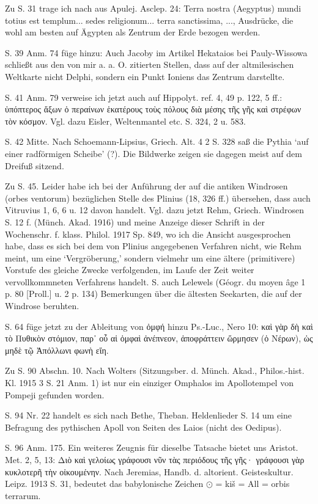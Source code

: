 \documentclass[a4paper, 11pt, oneside]{article}
\begin{document}
Zu S. 31 trage ich nach aus Apulej. Asclep. 24: Terra nostra (Aegyptus) mundi totius est templum... sedes religionum... terra sanctissima, ..., Ausdrücke, die wohl am besten auf Ägypten als Zentrum der Erde bezogen werden.

S. 39 Anm. 74 füge hinzu: Auch Jacoby im Artikel Hekataios bei Pauly-Wissowa schließt aus den von mir a. a. O. zitierten Stellen, dass auf der altmilesischen Weltkarte nicht Delphi, sondern ein Punkt Ioniens das Zentrum darstellte.

S. 41 Anm. 79 verweise ich jetzt auch auf Hippolyt. ref. 4, 49 p. 122, 5 ff.: ὑπόπτερος ἄξων ὁ περαίνων ἑκατέρους τοὺς πόλους διὰ μέσης τῆς γῆς καὶ στρέφων τὸν κόσμον. Vgl. dazu Eisler, Weltenmantel etc. S. 324, 2 u. 583.

S. 42 Mitte. Nach Schoemann-Lipsius, Griech. Alt. 4 2 S. 328 saß die Pythia `auf einer radförmigen Scheibe' (?). Die Bildwerke zeigen sie dagegen meist auf dem Dreifuß sitzend.

Zu S. 45. Leider habe ich bei der Anführung der auf die antiken Windrosen (orbes ventorum) bezüglichen Stelle des Plinius (18, 326 ff.) übersehen, dass auch Vitruvius 1, 6, 6 u. 12 davon handelt. Vgl. dazu jetzt Rehm, Griech. Windrosen S. 12 f. (Münch. Akad. 1916) und meine Anzeige dieser Schrift in der Wochenschr. f. klass. Philol. 1917 Sp. 849, wo ich die Ansicht ausgesprochen habe, dass es sich bei dem von Plinius angegebenen Verfahren nicht, wie Rehm meint, um eine `Vergröberung,' sondern vielmehr um eine ältere (primitivere) Vorstufe des gleiche Zwecke verfolgenden, im Laufe der Zeit weiter vervollkommneten Verfahrens handelt. S. auch Lelewels (Géogr. du moyen âge 1 p. 80 [Proll.] u. 2 p. 134) Bemerkungen über die ältesten Seekarten, die auf der Windrose beruhten.

S. 64 füge jetzt zu der Ableitung von ὀμφή hinzu Ps.-Luc., Nero 10: καὶ γὰρ δὴ καὶ τὸ Πυθικὸν στόμιον, παρ᾽ οὗ αἱ ὀμφαὶ ἀνέπνεον,
ἀποφράττειν ὥρμησεν (ὁ Νέρων), ὡς μηδὲ τῷ Ἀπόλλωνι φωνὴ εἴη.

Zu S. 90 Abschn. 10. Nach Wolters (Sitzungsber. d. Münch. Akad., Philos.-hist. Kl. 1915 3 S. 21 Anm. 1) ist nur ein einziger Omphalos im Apollotempel von Pompeji gefunden worden.

S. 94 Nr. 22 handelt es sich nach Bethe, Theban. Heldenlieder S. 14 um eine Befragung des pythischen Apoll von Seiten des Laios (nicht des Oedipus).

S. 96 Anm. 175. Ein weiteres Zeugnis für dieselbe Tatsache bietet uns Aristot. Met. 2, 5, 13: Διὸ καὶ γελοίως γράφουσι νῦν τὰς περιόδους τῆς γῆς· γράφουσι γὰρ κυκλοτερῆ τὴν οἰκουμένην. Nach Jeremias, Handb. d. altorient. Geisteskultur. Leipz. 1913 S. 31, bedeutet das babylonische Zeichen $\odot$ = kiš = All = orbis terrarum.
\end{document}
